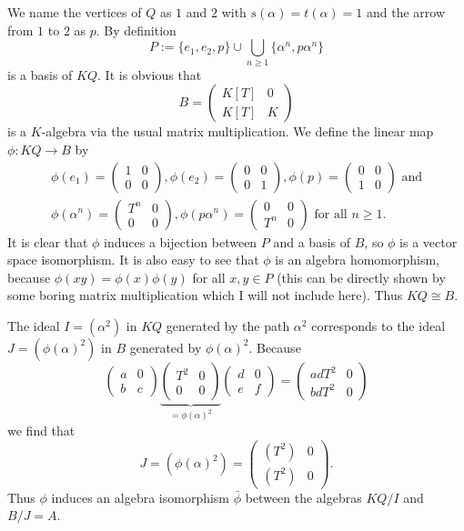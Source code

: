 \documentclass[a4paper,10pt]{article}
\theoremstyle{definition}
\newcommand{\vect}[1]{\begin{pmatrix}#1\end{pmatrix}}
\begin{document}
\section{}
We name the vertices of $Q$ as $1$ and $2$ with $s(\alpha) = t(\alpha) = 1$ and the arrow from $1$ to $2$ as $p$. By definition
\[
 P := \{e_1, e_2, p\} \cup \bigcup_{n \geq 1} \{\alpha^n, p\alpha^n \}
\]
is a basis of $KQ$. It is obvious that
\[
 B =
 \begin{pmatrix}
  K[T] & 0 \\
  K[T] & K
 \end{pmatrix}
\]
is a $K$-algebra via the usual matrix multiplication. We define the linear map $\phi : KQ \rightarrow B$ by
\begin{gather*}
 \phi(e_1) = \vect{1 & 0 \\ 0 & 0},
 \phi(e_2) = \vect{0 & 0 \\ 0 & 1},
 \phi(p) = \vect{0 & 0 \\ 1 & 0} \text{ and} \\
 \phi(\alpha^n) = \vect{T^n & 0 \\ 0 & 0},
 \phi(p\alpha^n) = \vect{0 & 0 \\ T^n & 0} \text{ for all } n \geq 1.
\end{gather*}
It is clear that $\phi$ induces a bijection between $P$ and a basis of $B$, so $\phi$ is a vector space isomorphism. It is also easy to see that $\phi$ is an algebra homomorphism, because $\phi(xy) = \phi(x)\phi(y)$ for all $x,y \in P$ (this can be directly shown by some boring matrix multiplication which I will not include here). Thus $KQ \cong B$.

The ideal $I = (\alpha^2)$ in $KQ$ generated by the path $\alpha^2$ corresponds to the ideal $J = (\phi(\alpha)^2)$ in $B$ generated by $\phi(\alpha)^2$. Because
\[
 \begin{pmatrix}
  a & 0 \\
  b & c
 \end{pmatrix}
 \underbrace{\begin{pmatrix}
  T^2 & 0 \\
  0 & 0
 \end{pmatrix}}_{= \phi(\alpha)^2}
 \begin{pmatrix}
  d & 0 \\
  e & f
 \end{pmatrix}
 =
 \begin{pmatrix}
  adT^2 & 0 \\
  bdT^2 & 0
 \end{pmatrix}
\]
we find that
\[
 J
 =
 (\phi(\alpha)^2)
 =
 \begin{pmatrix}
  (T^2) & 0 \\
  (T^2) & 0
 \end{pmatrix}.
\]
Thus $\phi$ induces an algebra isomorphism $\bar{\phi}$ between the algebras $KQ/I$ and $B/J = A$.
\end{document}
